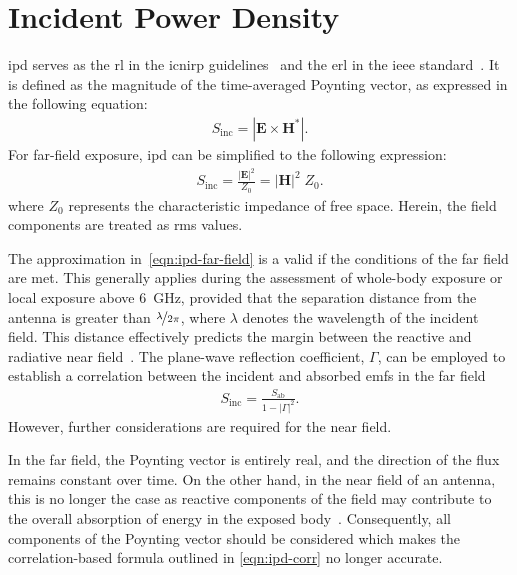 \section{Incident Power Density}
\gls{ipd} serves as the \gls{rl} in the \gls{icnirp} guidelines~\cite{ICNIRP2020Guidelines} and the \gls{erl} in the \gls{ieee} standard~\cite{IEEE2019Standard}.
It is defined as the magnitude of the time-averaged Poynting vector, as expressed in the following equation:
\begin{align}
    \label{eqn:ipd}
    S_\text{inc} = \left| \mathbf{E} \times \mathbf{H}^* \right|.
\end{align}
For far-field exposure, \gls{ipd} can be simplified to the following expression:
\begin{align}
    \label{eqn:ipd-far-field}
    S_\text{inc} = \frac{\left| \mathbf{E} \right|^2}{Z_0} = \left| \mathbf{H} \right|^2 \; Z_0.
\end{align}
where $Z_0$ represents the characteristic impedance of free space.
Herein, the field components are treated as \gls{rms} values.

The approximation in~\cref{eqn:ipd-far-field} is a valid if the conditions of the far field are met.
This generally applies during the assessment of whole-body exposure or local exposure above \SI{6}{\GHz}, provided that the separation distance from the antenna is greater than $\nicefrac{\lambda}{2 \pi}$, where $\lambda$ denotes the wavelength of the incident field.
This distance effectively predicts the margin between the reactive and radiative near field~\cite{Carrasco2019Exposure}.
The plane-wave reflection coefficient, $\Gamma$, can be employed to establish a correlation between the incident and absorbed \gls{emf}s in the far field
\begin{align}
    \label{eqn:ipd-corr}
    S_\text{inc} = \frac{S_\text{ab}}{1 - \left| \Gamma \right|^2}.
\end{align}
However, further considerations are required for the near field.

In the far field, the Poynting vector is entirely real, and the direction of the flux remains constant over time.
On the other hand, in the near field of an antenna, this is no longer the case as reactive components of the field may contribute to the overall absorption of energy in the exposed body~\cite{Kuster1992Energy}.
Consequently, all components of the Poynting vector should be considered which makes the correlation-based formula outlined in \cref{eqn:ipd-corr} no longer accurate.

